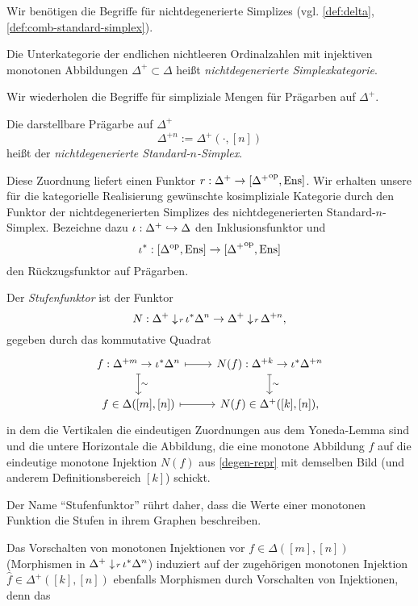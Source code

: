 Wir benötigen die Begriffe für nichtdegenerierte Simplizes
(vgl. \ref{def:delta}, \ref{def:comb-standard-simplex}).
\begin{defn}
  Die Unterkategorie der endlichen nichtleeren Ordinalzahlen mit
  injektiven monotonen Abbildungen $\Delta^+ \subset \Delta$ heißt
  \emph{nichtdegenerierte Simplexkategorie}.
\end{defn}
Wir wiederholen die Begriffe für simpliziale Mengen für Prägarben auf
$\Delta^+$.
\begin{defn}
  Die darstellbare Prägarbe auf $\Delta^+$
  \[ \Delta^{+n} :=  \Delta^+(\cdot, [n]) \]
  heißt der \emph{nichtdegenerierte Standard-$n$-Simplex}.
\end{defn}
Diese Zuordnung liefert einen Funktor $r: \Delta^+ \to [{\Delta^+}^\mathrm{op},
  \operatorname{Ens}]$. Wir erhalten unsere für die kategorielle Realisierung
gewünschte kosimpliziale Kategorie durch den Funktor der
nichtdegenerierten Simplizes des nichtdegenerierten
Standard-$n$-Simplex. Bezeichne dazu $\iota: \Delta^+ \hookrightarrow \Delta$ den
Inklusionsfunktor und
\[ \iota^*: [\Delta^\mathrm{op}, \operatorname{Ens}] \to [{\Delta^+}^\mathrm{op}, \operatorname{Ens}] \]
den Rückzugsfunktor auf Prägarben.
\begin{defn}
  Der \emph{Stufenfunktor} ist der Funktor
  \[N: \Delta^+ \downarrow \! {\scriptstyle r} \, \iota^* \Delta^n
  \to \Delta^+ \downarrow \! {\scriptstyle r} \, \Delta^{+n},
  \]
  gegeben durch das kommutative Quadrat
  \[ 
  \begin{tikzcd}
    f: \Delta^{+m} \to \iota^* \Delta^n \dar[mapsto]{\sim} \rar[mapsto]
    & N(f):  \Delta^{+k}  \to \iota^* \Delta^{+n} \dar[mapsto]{\sim} \\
    f \in \Delta([m], [n]) \rar[mapsto]
    & N(f) \in \Delta^+([k], [n]),
  \end{tikzcd}
  \]
  in dem die Vertikalen die eindeutigen Zuordnungen aus dem
  Yoneda-Lemma sind und die untere Horizontale die Abbildung, die eine
  monotone Abbildung $f$ auf die eindeutige monotone Injektion $N(f)$
  aus \ref{degen-repr} mit demselben Bild (und anderem
  Definitionsbereich $[k]$) schickt.
\end{defn}
\begin{bem}
  Der Name ``Stufenfunktor'' rührt daher, dass die Werte einer
  monotonen Funktion die Stufen in ihrem Graphen beschreiben.
\end{bem}
Das Vorschalten von monotonen Injektionen vor $f \in \Delta([m], [n])$
(Morphismen in $\Delta^+ \downarrow \! {\scriptstyle r} \, \iota^* \Delta^n$) induziert
auf der zugehörigen monotonen Injektion $\hat{f} \in \Delta^+([k],
[n])$ ebenfalls Morphismen durch Vorschalten von Injektionen, denn das
